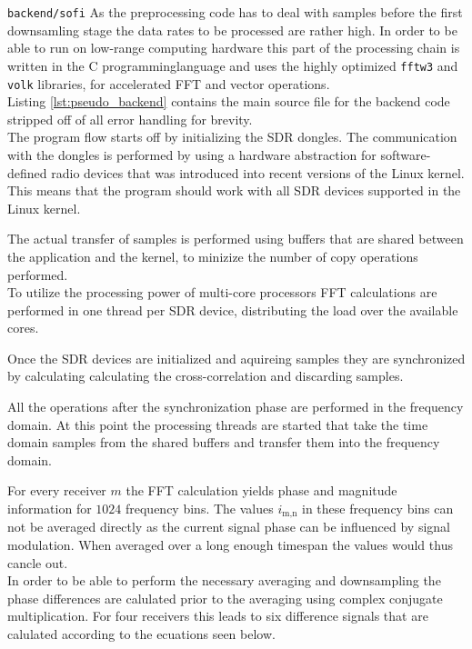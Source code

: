 \begin{subchapter}{\texttt{backend/sofi}}
  As the preprocessing code has to deal with samples
  before the first downsamling stage the data rates to be
  processed are rather high.
  In order to be able to run on low-range computing hardware
  this part of the processing chain is written in the C
  programminglanguage and
  uses the highly optimized \texttt{fftw3} and \texttt{volk}
  libraries, for accelerated FFT and vector operations. \\

  Listing \ref{lst:pseudo_backend} contains the main source
  file for the backend code stripped off of all error handling
  for brevity. \\

  The program flow starts off by initializing the SDR
  dongles. The communication with the dongles is performed
  by using a hardware abstraction for software-defined radio
  devices that was introduced into recent versions of
  the Linux kernel. This means that the program should work
  with all SDR devices supported in the Linux kernel.

  The actual transfer of samples is performed using
  buffers that are shared between the application and
  the kernel, to minizize the number of copy operations performed. \\

  To utilize the processing power of multi-core processors
  FFT calculations are performed in one thread per
  SDR device, distributing the load over the available cores.

  Once the SDR devices are initialized and aquireing samples
  they are synchronized by calculating calculating the
  cross-correlation and discarding samples.

  All the operations after the synchronization phase are
  performed in the frequency domain.
  At this point the processing threads are started that
  take the time domain samples from the shared buffers and transfer
  them into the frequency domain.

  For every receiver $m$ the FFT calculation yields phase
  and magnitude information for $1024$ frequency bins.
  The values $i_\text{m,n}$ in these frequency bins can not
  be averaged directly as the current signal phase can be
  influenced by signal modulation. When averaged over
  a long enough timespan the values would thus cancle out. \\

  In order to be able to perform the necessary averaging
  and downsampling the phase differences are calulated prior
  to the averaging using complex conjugate multiplication.
  For four receivers this leads to six difference signals
  that are calulated according to the ecuations seen below.


\end{subchapter}
